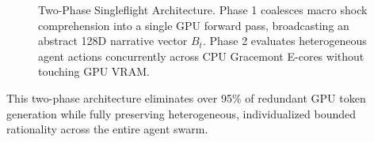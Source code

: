 \begin{figure}[htbp]
\caption{Two-Phase Singleflight Architecture. Phase 1 coalesces macro shock comprehension into a single GPU forward pass, broadcasting an abstract 128D narrative vector $B_t$. Phase 2 evaluates heterogeneous agent actions concurrently across CPU Gracemont E-cores without touching GPU VRAM.}
\label{fig:two_phase_singleflight}
\end{figure}

This two-phase architecture eliminates over 95\% of redundant GPU token generation while fully preserving heterogeneous, individualized bounded rationality across the entire agent swarm.
